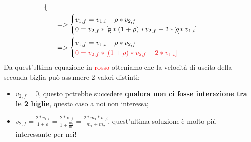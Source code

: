 \begin{align*}
\begin{cases}
                        \end{cases}\\
                        & &&=>
                        \begin{cases}
                            v_{1, f}=v_{1, i}-\rho*v_{2, f}\\
                            0 =v_{2, f}*[\bcancel{\rho}*(1+\rho)*v_{2, f}-2*\bcancel{\rho}*v_{1, i}]
                        \end{cases}\\
                        & &&=>
                        \begin{cases}
                            v_{1, f}=v_{1, i}-\rho*v_{2, f}\\
                            \textcolor{Red}{0 =v_{2, f}*[(1+\rho)*v_{2, f}-2*v_{1, i}]}
                        \end{cases}\\
                    \end{align*}
                    Da quest'ultima equazione in \textcolor{Red}{rosso} otteniamo che la velocità di uscita della seconda biglia può assumere 2 valori distinti:
                    \begin{itemize}
                        \item $v_{2, f} = 0$, questo potrebbe succedere \textbf{qualora non ci fosse interazione tra le 2 biglie}, questo caso a noi non interessa;
                        \item $v_{2, f} = \frac{2*v_{1, i}}{1+\rho} = \frac{2*v_{1, i}}{1+\frac{m_2}{m_1}} = \frac{2*m_1*v_{1, i}}{m_1+m_2}$, quest'ultima soluzione è molto più interessante per noi!
                    \end{itemize}

